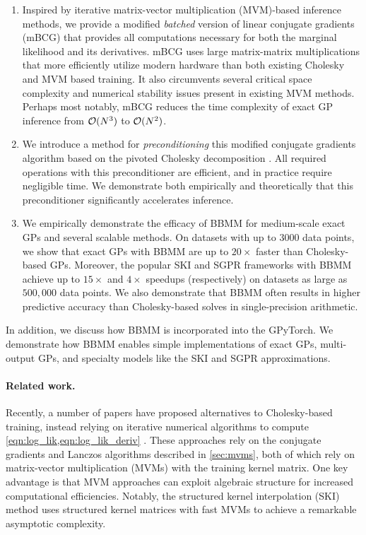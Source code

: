 \begin{enumerate}
	\item Inspired by iterative matrix-vector multiplication (MVM)-based inference methods, we provide a modified \emph{batched} version of linear conjugate gradients (mBCG) that provides all computations necessary for both the marginal likelihood and its derivatives.
		mBCG uses large matrix-matrix multiplications that more efficiently utilize modern hardware than both existing Cholesky and MVM based training.
		It also circumvents several critical space complexity and numerical stability issues present in existing MVM methods.
		Perhaps most notably, mBCG reduces the time complexity of exact GP inference from $\bigo{N^3}$ to $\bigo{N^2}$.

	\item We introduce a method for \emph{preconditioning} this modified conjugate gradients algorithm based on the pivoted Cholesky decomposition \cite{bach2013sharp,harbrecht2012low}.
		All required operations with this preconditioner are efficient, and in practice require negligible time.
		We demonstrate both empirically and theoretically that this preconditioner significantly accelerates inference.

	\item We empirically demonstrate the efficacy of BBMM for medium-scale exact GPs and several scalable methods.
		On datasets with up to $3000$ data points, we show that exact GPs with BBMM are up to $20\times$ faster than Cholesky-based GPs.
		Moreover, the popular SKI \cite{wilson2015kernel} and SGPR \cite{titsias2009variational} frameworks with BBMM achieve up to $15\times$ and $4\times$ speedups (respectively) on datasets as large as $500,\!000$ data points.
		We also demonstrate that BBMM often results in higher predictive accuracy than Cholesky-based solves in single-precision arithmetic.
\end{enumerate}
%
\noindent
In addition, we discuss how BBMM is incorporated into the GPyTorch.
We demonstrate how BBMM enables simple implementations of exact GPs, multi-output GPs, and specialty models like the SKI and SGPR approximations.

\paragraph{Related work.}
Recently, a number of papers have proposed alternatives to Cholesky-based training, instead relying on iterative numerical algorithms to compute \cref{eqn:log_lik,eqn:log_lik_deriv} \cite{cunningham2008fast,murray2009gaussian,saatcci2012scalable,wilson2014thesis,wilson2015kernel,cutajar2016preconditioning,dong2017scalable,gardner2018product}.
These approaches rely on the conjugate gradients and Lanczos algorithms described in \cref{sec:mvms}, both of which rely on matrix-vector multiplication (MVMs) with the training kernel matrix.
One key advantage is that MVM approaches can exploit algebraic structure for increased computational efficiencies.
Notably, the structured kernel interpolation (SKI) method \cite{wilson2015kernel} uses structured kernel matrices with fast MVMs to achieve a remarkable asymptotic complexity.

